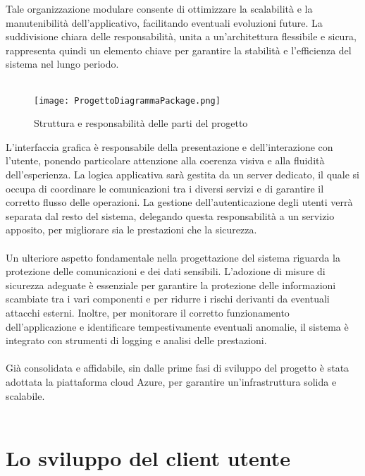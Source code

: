 Tale organizzazione modulare consente di ottimizzare la scalabilità e la manutenibilità dell’applicativo,
facilitando eventuali evoluzioni future.
La suddivisione chiara delle responsabilità, unita a un’architettura flessibile e sicura,
rappresenta quindi un elemento chiave per garantire la stabilità e l’efficienza del sistema nel lungo periodo.\\
\\
\begin{figure}[htb]
    \centering
    \texttt{[image: ProgettoDiagrammaPackage.png]}
    \caption{Struttura e responsabilità delle parti del progetto}
\end{figure}
\clearpage
L'interfaccia grafica è responsabile della presentazione e dell’interazione con l’utente, 
ponendo particolare attenzione alla coerenza visiva e alla fluidità dell’esperienza.
La logica applicativa sarà gestita da un server dedicato, 
il quale si occupa di coordinare le comunicazioni tra i diversi servizi
e di garantire il corretto flusso delle operazioni.
La gestione dell’autenticazione degli utenti verrà separata dal resto del sistema, 
delegando questa responsabilità a un servizio apposito,
per migliorare sia le prestazioni che la sicurezza.\\
\\
Un ulteriore aspetto fondamentale nella progettazione del sistema riguarda 
la protezione delle comunicazioni e dei dati sensibili.
L’adozione di misure di sicurezza adeguate è essenziale per garantire la protezione delle informazioni scambiate tra i vari componenti e
per ridurre i rischi derivanti da eventuali attacchi esterni.
Inoltre, per monitorare il corretto funzionamento dell’applicazione e 
identificare tempestivamente eventuali anomalie,
il sistema è integrato con strumenti di logging e analisi delle prestazioni.\\
\\
Già consolidata e affidabile, sin dalle prime fasi di sviluppo del progetto è stata adottata la piattaforma cloud Azure, per garantire un'infrastruttura solida e scalabile.\\
\\

\section{Lo sviluppo del client utente}


